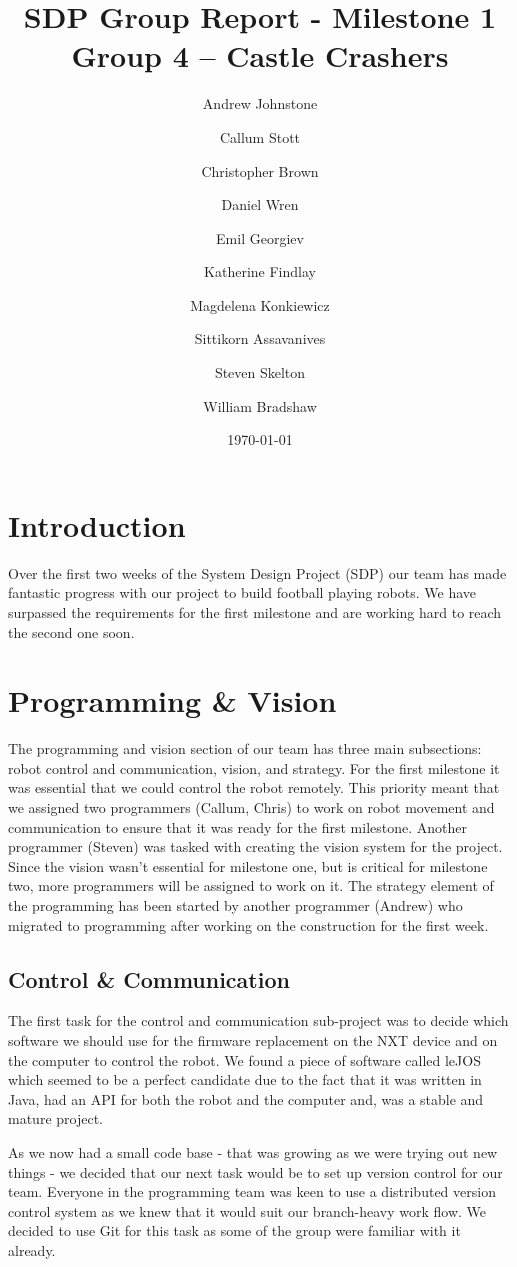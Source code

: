 \documentclass[12pt, a4paper, titlepage]{article}
\title{\small{SDP Group Report - Milestone 1} \\ \huge Group 4 -- Castle Crashers}
\author{Andrew Johnstone \and Callum Stott \and Christopher Brown \and Daniel Wren \and Emil Georgiev \and Katherine Findlay \and Magdelena Konkiewicz \and Sittikorn Assavanives \and Steven Skelton \and William Bradshaw}
\date{\today}
\begin{document}
\maketitle

\section{Introduction}

Over the first two weeks of the System Design Project (SDP) our team has made
fantastic progress with our project to build football playing robots. We have
surpassed the requirements for the first milestone and are working hard to reach
the second one soon.

\section{Programming \& Vision}

The programming and vision section of our team has three main subsections:
robot control and communication, vision, and strategy. For the first milestone
it was essential that we could control the robot remotely. This priority meant
that we assigned two programmers (Callum, Chris) to work on robot movement and
communication to ensure that it was ready for the first milestone. Another
programmer (Steven) was tasked with creating the vision system for the project.
Since the vision wasn't essential for milestone one, but is critical for
milestone two, more programmers will be assigned to work on it. The strategy
element of the programming has been started by another programmer (Andrew) who
migrated to programming after working on the construction for the first
week.

\subsection{Control \& Communication}

The first task for the control and communication sub-project was to decide which
software we should use for the firmware replacement on the NXT device and on
the computer to control the robot. We found a piece of software called
leJOS\cite{lejos} which seemed to be a perfect candidate due to the fact that
it was written in Java, had an API for both the robot and the computer and, was
a stable and mature project.

As we now had a small code base - that was growing as we were trying out new
things - we decided that our next task would be to set up version control
for our team. Everyone in the programming team was keen to use a distributed
version control system as we knew that it would suit our branch-heavy work flow.
We decided to use Git\cite{git-scm} for this task as some of the group were
familiar with it already.
\end{document}
